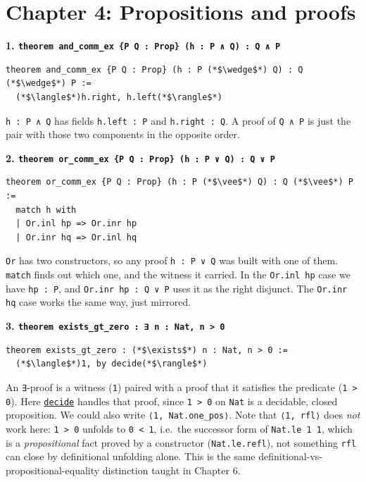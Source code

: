 \section{Chapter 4: Propositions and proofs}\label{sec:15-appendix-solutions:03-chapter-4:1}

\textbf{1. \texttt{theorem and\_\allowbreak{}comm\_\allowbreak{}ex \{P Q : Prop\} (h : P ∧ Q) : Q ∧ P}}

\begin{lstlisting}
theorem and_comm_ex {P Q : Prop} (h : P (*$\wedge$*) Q) : Q (*$\wedge$*) P :=
  (*$\langle$*)h.right, h.left(*$\rangle$*)
\end{lstlisting}

\texttt{h : P ∧ Q} has fields \texttt{h.left : P} and \texttt{h.right : Q}. A proof of \texttt{Q ∧ P} is just the pair with those two components in the opposite order.

\textbf{2. \texttt{theorem or\_\allowbreak{}comm\_\allowbreak{}ex \{P Q : Prop\} (h : P ∨ Q) : Q ∨ P}}

\begin{lstlisting}
theorem or_comm_ex {P Q : Prop} (h : P (*$\vee$*) Q) : Q (*$\vee$*) P :=
  match h with
  | Or.inl hp => Or.inr hp
  | Or.inr hq => Or.inl hq
\end{lstlisting}

\texttt{Or} has two constructors, so any proof \texttt{h : P ∨ Q} was built with one of them. \texttt{match} finds out which one, and the witness it carried. In the \texttt{Or.inl hp} case we have \texttt{hp : P}, and \texttt{Or.inr hp : Q ∨ P} uses it as the right disjunct. The \texttt{Or.inr hq} case works the same way, just mirrored.

\textbf{3. \texttt{theorem exists\_\allowbreak{}gt\_\allowbreak{}zero : ∃ n : Nat, n > 0}}

\begin{lstlisting}
theorem exists_gt_zero : (*$\exists$*) n : Nat, n > 0 :=
  (*$\langle$*)1, by decide(*$\rangle$*)
\end{lstlisting}

An \texttt{∃}-proof is a witness (\texttt{1}) paired with a proof that it satisfies the predicate (\texttt{1 > 0}). Here \href{https://lean-lang.org/doc/reference/latest/Tactic-Proofs/Tactic-Reference/}{\texttt{decide}} handles that proof, since \texttt{1 > 0} on \texttt{Nat} is a decidable, closed proposition. We could also write \texttt{⟨1, Nat.one\_\allowbreak{}pos⟩}. Note that \texttt{⟨1, rfl⟩} does \emph{not} work here: \texttt{1 > 0} unfolds to \texttt{0 < 1}, i.e.~the successor form of \texttt{Nat.le 1 1}, which is a \emph{propositional} fact proved by a constructor (\texttt{Nat.le.refl}), not something \texttt{rfl} can close by definitional unfolding alone. This is the same definitional-vs-propositional-equality distinction taught in Chapter 6.
